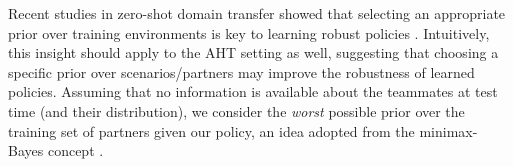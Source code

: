 Recent studies in zero-shot domain transfer showed that selecting an appropriate prior over training environments is key to learning robust policies \citep{pinto_robust_adversarial_reinforcement_2017, dennis_emergent_complexity_zero_2020, garcin_how_level_sampling_2023, jiang_prioritized_level_replay_2021,buening_minimax_bayes_reinforcement_2023, li_bayes_optimal_robust_2024}. Intuitively, this insight should apply to the AHT setting as well, suggesting that choosing a specific prior over scenarios/partners may improve the robustness of learned policies. Assuming that no information is available about the teammates at test time (and their distribution), we consider the \emph{worst} possible prior over the training set of partners given our policy, an idea adopted from the minimax-Bayes concept \citep{berger_statistical_decision_theory_1985}.













